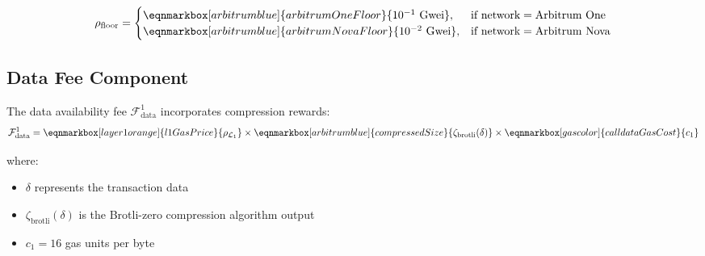\documentclass[letterpaper,10pt]{article} %
\newcommand{\layer}[1]{\mathcal{L}_{#1}}
\newcommand{\fee}[2]{\mathcal{F}_{#1}^{#2}}
\begin{document}
\begin{equation}
    \label{eq:arbitrum_floor_values}
    \rho_{\text{floor}} = \begin{cases}
    \eqnmarkbox[arbitrumblue]{arbitrumOneFloor}{10^{-1} \text{ Gwei}}, & \text{if network} = \text{Arbitrum One} \\
    \eqnmarkbox[arbitrumblue]{arbitrumNovaFloor}{10^{-2} \text{ Gwei}}, & \text{if network} = \text{Arbitrum Nova}
    \end{cases}
\end{equation}
\vspace{\baselineskip} %

\newpage
\vspace{\baselineskip} %
\subsection{Data Fee Component} %

The data availability fee $\fee{\text{data}}{1}$ incorporates compression rewards:
\begin{equation}
    \label{eq:arbitrum_data_fee}
    \fee{\text{data}}{1} = 
    \eqnmarkbox[layer1orange]{l1GasPrice}{\rho_{\layer{1}}} \times 
    \eqnmarkbox[arbitrumblue]{compressedSize}{\zeta_{\text{brotli}}(\delta)} \times 
    \eqnmarkbox[gascolor]{calldataGasCost}{c_1}
\end{equation}

where:
\begin{itemize}
    \item $\delta$ represents the transaction data
    \item $\zeta_{\text{brotli}}(\delta)$ is the Brotli-zero compression algorithm output
    \item $c_1 = 16$ gas units per byte
\end{itemize}
\end{document}
